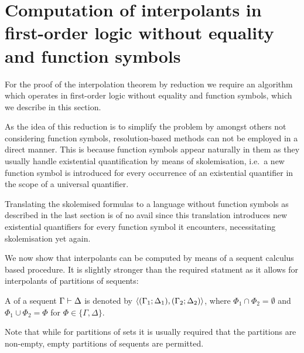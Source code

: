 \section{Computation of interpolants in first-order logic without equality and function symbols}

For the proof of the interpolation theorem by reduction we require an algorithm which operates in first-order logic without equality and function symbols, which we describe in this section.

\begin{remark}
	As the idea of this reduction is to simplify the problem by amongst others not considering function symbols,
	resolution-based methods can not be employed in a direct manner.
	This is because function symbols appear naturally in them as they usually handle existential quantification by means of skolemisation, i.e.~a new function symbol is introduced for every occurrence of an existential quantifier in the scope of a universal quantifier.
	
	Translating the skolemised formulas to a language without function symbols as described in the last section is of no avail since this translation introduces new existential quantifiers for every function symbol it encounters, necessitating skolemisation yet again.
\end{remark}

We now show that interpolants can be computed by means of a sequent calculus based procedure.
It is slightly stronger than the required statment as it allows for interpolants of partitions of sequents:

\begin{defi}
	A  of a sequent $\Gamma \vdash \Delta$ is denoted by $ \langle (\Gamma_1; \Delta_1), (\Gamma_2; \Delta_2)\rangle $, where $\Phi_1 \cap \Phi_2 = \emptyset$ and $\Phi_1 \cup \Phi_2 = \Phi$ for $\Phi \in \{\Gamma, \Delta\}$.
\end{defi}
Note that while for partitions of sets it is usually required that the partitions are non-empty, empty partitions of sequents are permitted.

